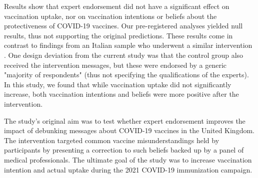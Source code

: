 \documentclass[authordate, empirical]{jote-new-article}
\begin{document}
	Results show that expert endorsement did not have a significant effect on vaccination uptake, nor on vaccination intentions or beliefs about the protectiveness of COVID-19 vaccines. Our pre-registered analyses yielded null results, thus not supporting the original predictions. These results come in contrast to findings from an Italian sample who underwent a similar intervention \parencites{Ronzani2022}. One design deviation from the current study was that the control group also received the intervention messages, but these were endorsed by a generic "majority of respondents" (thus not specifying the qualifications of the experts). In this study, we found that while vaccination uptake did not significantly increase, both vaccination intentions and beliefs were more positive after the intervention.

	\begin{originalPurpose}



		The study's original aim was to test whether expert endorsement improves the impact of debunking messages about COVID-19 vaccines in the United Kingdom. The intervention targeted common vaccine misunderstandings held by participants by presenting a correction to such beliefs backed up by a panel of medical professionals. The ultimate goal of the study was to increase vaccination intention and actual uptake during the 2021 COVID-19 immunization campaign.
	
		\end{originalPurpose}
\end{document}
